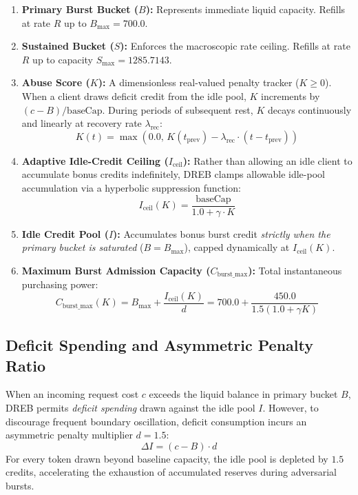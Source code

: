 \documentclass[conference]{IEEEtran}
\begin{document}
\begin{enumerate}
    \item \textbf{Primary Burst Bucket ($B$):} Represents immediate liquid capacity. Refills at rate $R$ up to $B_{\max} = 700.0$.
    \item \textbf{Sustained Bucket ($S$):} Enforces the macroscopic rate ceiling. Refills at rate $R$ up to capacity $S_{\max} = 1285.7143$.
    \item \textbf{Abuse Score ($K$):} A dimensionless real-valued penalty tracker ($K \ge 0$). When a client draws deficit credit from the idle pool, $K$ increments by $(c - B) / \text{baseCap}$. During periods of subsequent rest, $K$ decays continuously and linearly at recovery rate $\lambda_{\text{rec}}$:
    \begin{equation}
    K(t) = \max\left(0.0, \, K(t_{\text{prev}}) - \lambda_{\text{rec}} \cdot (t - t_{\text{prev}})\right)
    \end{equation}
    \item \textbf{Adaptive Idle-Credit Ceiling ($I_{\text{ceil}}$):} Rather than allowing an idle client to accumulate bonus credits indefinitely, DREB clamps allowable idle-pool accumulation via a hyperbolic suppression function:
    \begin{equation}
    I_{\text{ceil}}(K) = \frac{\text{baseCap}}{1.0 + \gamma \cdot K}
    \end{equation}
    \item \textbf{Idle Credit Pool ($I$):} Accumulates bonus burst credit \textit{strictly when the primary bucket is saturated} ($B = B_{\max}$), capped dynamically at $I_{\text{ceil}}(K)$.
    \item \textbf{Maximum Burst Admission Capacity ($C_{\text{burst\_max}}$):} Total instantaneous purchasing power:
    \begin{equation}
    C_{\text{burst\_max}}(K) = B_{\max} + \frac{I_{\text{ceil}}(K)}{d} = 700.0 + \frac{450.0}{1.5(1.0 + \gamma K)}
    \end{equation}
\end{enumerate}

\subsection{Deficit Spending and Asymmetric Penalty Ratio}
When an incoming request cost $c$ exceeds the liquid balance in primary bucket $B$, DREB permits \textit{deficit spending} drawn against the idle pool $I$. However, to discourage frequent boundary oscillation, deficit consumption incurs an asymmetric penalty multiplier $d = 1.5$:
\begin{equation}
\Delta I = (c - B) \cdot d
\end{equation}
For every token drawn beyond baseline capacity, the idle pool is depleted by $1.5$ credits, accelerating the exhaustion of accumulated reserves during adversarial bursts.
\end{document}
